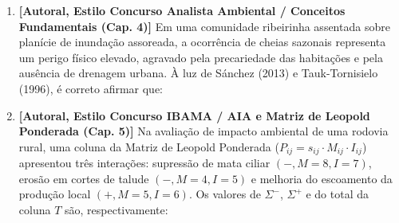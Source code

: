 \begin{enumerate}[leftmargin=1.8em, itemsep=6pt]
  \item \textbf{[Autoral, Estilo Concurso Analista Ambiental / Conceitos Fundamentais (Cap. 4)]} Em uma comunidade ribeirinha assentada sobre planície de inundação assoreada, a ocorrência de cheias sazonais representa um perigo físico elevado, agravado pela precariedade das habitações e pela ausência de drenagem urbana. À luz de Sánchez (2013) e Tauk-Tornisielo (1996), é correto afirmar que:
  \espacoResolucao[1.1cm]

  \item \textbf{[Autoral, Estilo Concurso IBAMA / AIA e Matriz de Leopold Ponderada (Cap. 5)]} Na avaliação de impacto ambiental de uma rodovia rural, uma coluna da Matriz de Leopold Ponderada ($P_{ij} = s_{ij} \cdot M_{ij} \cdot I_{ij}$) apresentou três interações: supressão de mata ciliar $(-, M=8, I=7)$, erosão em cortes de talude $(-, M=4, I=5)$ e melhoria do escoamento da produção local $(+, M=5, I=6)$. Os valores de $\Sigma^{-}$, $\Sigma^{+}$ e do total da coluna $T$ são, respectivamente:
  \espacoResolucao[1.3cm]


\end{enumerate}
